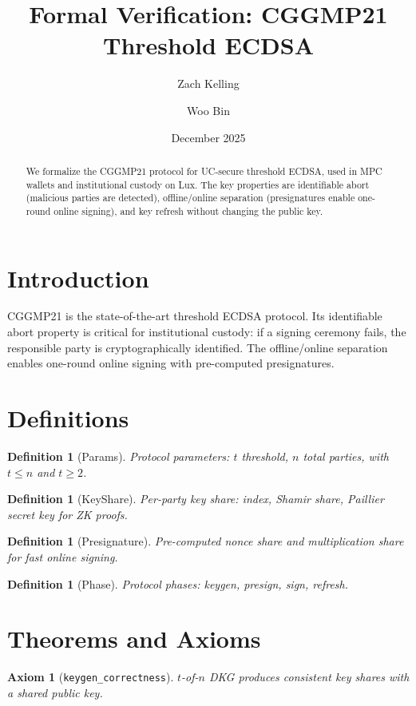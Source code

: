 \documentclass[11pt]{article}
\title{Formal Verification: CGGMP21 Threshold ECDSA}
\author{Zach Kelling \and Woo Bin}
\date{December 2025}
\newtheorem{definition}[theorem]{Definition}
\newtheorem{axiom_stmt}[theorem]{Axiom}
\begin{document}
\maketitle

\begin{abstract}
We formalize the CGGMP21 protocol for UC-secure threshold ECDSA, used in MPC wallets and institutional custody on Lux. The key properties are identifiable abort (malicious parties are detected), offline/online separation (presignatures enable one-round online signing), and key refresh without changing the public key.
\end{abstract}

\section{Introduction}
CGGMP21 is the state-of-the-art threshold ECDSA protocol. Its identifiable abort property is critical for institutional custody: if a signing ceremony fails, the responsible party is cryptographically identified. The offline/online separation enables one-round online signing with pre-computed presignatures.

\section{Definitions}
\begin{definition}[Params]
Protocol parameters: $t$ threshold, $n$ total parties, with $t \leq n$ and $t \geq 2$.
\end{definition}

\begin{definition}[KeyShare]
Per-party key share: index, Shamir share, Paillier secret key for ZK proofs.
\end{definition}

\begin{definition}[Presignature]
Pre-computed nonce share and multiplication share for fast online signing.
\end{definition}

\begin{definition}[Phase]
Protocol phases: keygen, presign, sign, refresh.
\end{definition}


\section{Theorems and Axioms}
\begin{axiom_stmt}[\texttt{keygen\_correctness}]
$t$-of-$n$ DKG produces consistent key shares with a shared public key.
\end{axiom_stmt}
\end{document}
